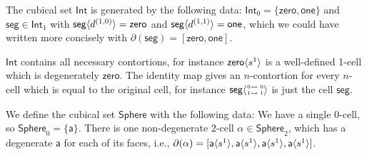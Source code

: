 \documentclass{llncs}
\newcommand{\mlist}[1]{[ {#1} ]}
\newcommand{\smap}[1]{s^{{#1}}}
\newcommand{\dmap}[2]{d^{({#1} , {#2})}}
\newcommand{\cont}[2]{\ensuremath{ \ifthenelse{\equal{#2}{}}{#1}{{#1}\langle{#2}\rangle}} }
\newcommand{\cset}[1]{\ensuremath{\mathsf{{#1}}}}
\newcommand{\boundary}[1]{\partial({#1})}
\newcommand{\substtwo}[2]{\tiny
  \arraycolsep=.4pt\def\arraystretch{1}
  \begin{array}{ll}
    0 &\mapsto {#1} \\
    1 &\mapsto {#2}
  \end{array}
}
\newcommand{\oneid}{\substtwo{0}{1}}
\begin{document}



\begin{example}\label{exp:int}
  The cubical set $\cset{Int}$ is generated by the following data: $\cset{Int}_0
  = \{ \cset{zero} , \cset{one} \}$ and $\cset{seg} \in \cset{Int}_1$ with
  $\cont{\cset{seg}}{\dmap{1}{0}} = \cset{zero}$ and $\cont{\cset{seg}}{\dmap{1}{1}} =
  \cset{one}$, which we could have written more concisely with
  $\boundary{\cset{seg}} = \mlist{\cset{zero}, \cset{one}}$.

  $\cset{Int}$ contains all necessary contortions, for instance
  $\cont{\cset{zero}}{\smap{1}}$ is a well-defined 1-cell which is
  degenerately $\cset{zero}$.
  The identity map gives an $n$-contortion for every $n$-cell which is equal
  to the original cell, for instance $\cont{\cset{seg}}{\oneid}$ is just the cell
  $\cset{seg}$.


\end{example}

\begin{example}\label{exp:sndsphere}
  We define the cubical set $\cset{Sphere}$ with the following data: We have a
  single 0-cell, so $\cset{Sphere}_0 = \{
  \cset{a} \}$. There is one non-degenerate 2-cell $\cset{\alpha} \in
  \cset{Sphere}_2$, which has a degenerate $\cset{a}$ for each of its faces,
  i.e.,
  $\boundary{\cset{\alpha}} = \mlist{ \cont{\cset{a}}{\smap{1}},
    \cont{\cset{a}}{\smap{1}}, \cont{\cset{a}}{\smap{1}}, \cont{\cset{a}}{\smap{1}} }$.
\end{example}

\end{document}
